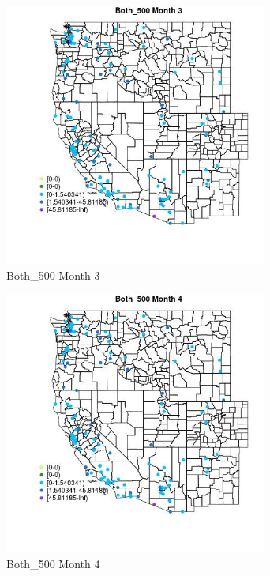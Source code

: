\begin{figure} 
\centering  
\includegraphics[width=0.77\textwidth]{Code_Outputs/Report_ML_input_PM25_Step4_part_e_de_duplicated_aves_MapObsMo3Both_500.jpg} 
\caption{\label{fig:Report_ML_input_PM25_Step4_part_e_de_duplicated_avesMapObsMo3Both_500}Both_500 Month 3} 
\end{figure} 
 

\begin{figure} 
\centering  
\includegraphics[width=0.77\textwidth]{Code_Outputs/Report_ML_input_PM25_Step4_part_e_de_duplicated_aves_MapObsMo4Both_500.jpg} 
\caption{\label{fig:Report_ML_input_PM25_Step4_part_e_de_duplicated_avesMapObsMo4Both_500}Both_500 Month 4} 
\end{figure} 
 

